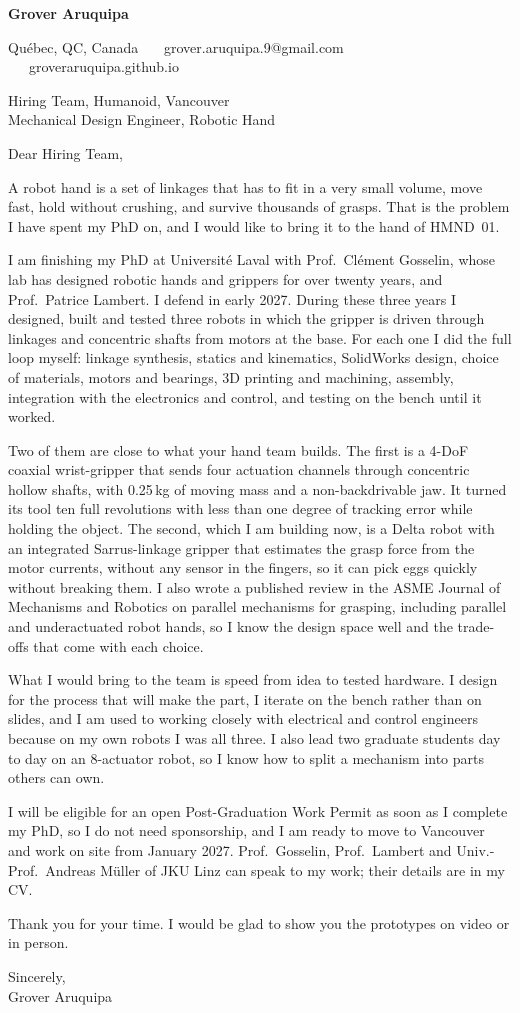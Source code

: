 \documentclass[11pt,letterpaper]{article}
\begin{document}
{\large\bfseries Grover Aruquipa}\par\vspace{-6pt}
{\small Qu\'ebec, QC, Canada \ \textbullet\ \ grover.aruquipa.9@gmail.com \ \textbullet\ \ groveraruquipa.github.io}

\vspace{4pt}
Hiring Team, Humanoid, Vancouver\\
Mechanical Design Engineer, Robotic Hand

Dear Hiring Team,

A robot hand is a set of linkages that has to fit in a very small volume, move fast, hold without crushing, and survive thousands of grasps. That is the problem I have spent my PhD on, and I would like to bring it to the hand of HMND~01.

I am finishing my PhD at Universit\'e Laval with Prof.\ Cl\'ement Gosselin, whose lab has designed robotic hands and grippers for over twenty years, and Prof.\ Patrice Lambert. I defend in early 2027. During these three years I designed, built and tested three robots in which the gripper is driven through linkages and concentric shafts from motors at the base. For each one I did the full loop myself: linkage synthesis, statics and kinematics, SolidWorks design, choice of materials, motors and bearings, 3D printing and machining, assembly, integration with the electronics and control, and testing on the bench until it worked.

Two of them are close to what your hand team builds. The first is a 4-DoF coaxial wrist-gripper that sends four actuation channels through concentric hollow shafts, with 0.25\,kg of moving mass and a non-backdrivable jaw. It turned its tool ten full revolutions with less than one degree of tracking error while holding the object. The second, which I am building now, is a Delta robot with an integrated Sarrus-linkage gripper that estimates the grasp force from the motor currents, without any sensor in the fingers, so it can pick eggs quickly without breaking them. I also wrote a published review in the ASME Journal of Mechanisms and Robotics on parallel mechanisms for grasping, including parallel and underactuated robot hands, so I know the design space well and the trade-offs that come with each choice.

What I would bring to the team is speed from idea to tested hardware. I design for the process that will make the part, I iterate on the bench rather than on slides, and I am used to working closely with electrical and control engineers because on my own robots I was all three. I also lead two graduate students day to day on an 8-actuator robot, so I know how to split a mechanism into parts others can own.

I will be eligible for an open Post-Graduation Work Permit as soon as I complete my PhD, so I do not need sponsorship, and I am ready to move to Vancouver and work on site from January 2027. Prof.\ Gosselin, Prof.\ Lambert and Univ.-Prof.\ Andreas M\"uller of JKU Linz can speak to my work; their details are in my CV.

Thank you for your time. I would be glad to show you the prototypes on video or in person.

Sincerely,\\
Grover Aruquipa
\end{document}
